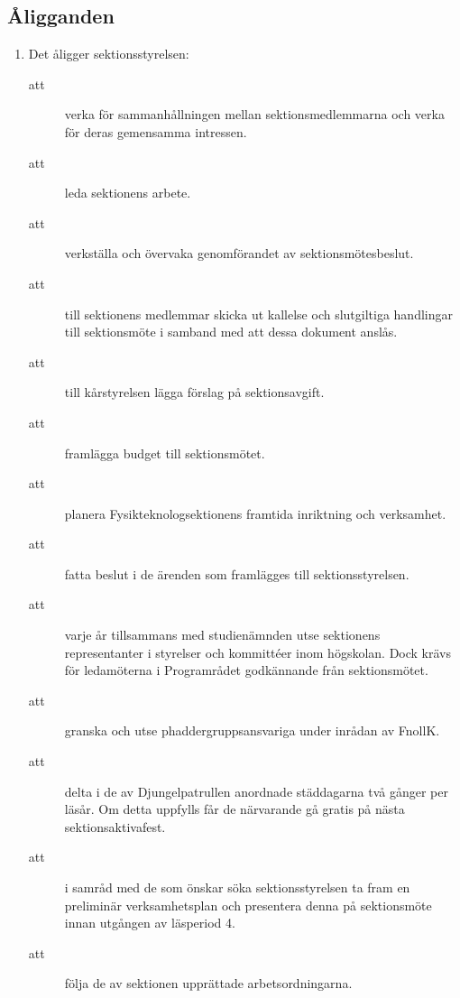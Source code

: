 \documentclass[11pt,a4paper]{article}
\begin{document}
\subsection{Åligganden}

\begin{enumerate}[\thesubsection .1]

  \item Det åligger sektionsstyrelsen:
    \begin{description}
      \item[att] verka för sammanhållningen mellan sektionsmedlemmarna
      och verka för deras gemensamma intressen.
      \item[att] leda sektionens arbete.
      \item[att] verkställa och övervaka genomförandet av sektionsmötesbeslut.
      \item[att] till sektionens medlemmar skicka ut kallelse och slutgiltiga handlingar
      till sektionsmöte i samband med att dessa dokument anslås.
      \item[att] till kårstyrelsen lägga förslag på sektionsavgift. 
      \item[att] framlägga budget till sektionsmötet.
      \item[att] planera Fysikteknologsektionens framtida inriktning och verk\-sam\-het.
      \item[att] fatta beslut i de ärenden som framlägges till sektionsstyrelsen.
      \item[att] varje år tillsammans med studienämnden utse
      sektionens representanter i styrelser och kommittéer inom
      högskolan. Dock krävs för ledamöterna i Programrådet godkännande
      från sektionsmötet.
      \item[att] granska och utse phaddergruppsansvariga under inrådan av
      FnollK.
      \item[att] delta i de av Djungelpatrullen anordnade städdagarna två gånger per
      läsår. Om detta uppfylls får de närvarande gå gratis på nästa
      sektionsaktivafest.
      \item[att] i samråd med de som önskar söka sektionsstyrelsen ta fram en preliminär 
      verksamhetsplan och presentera denna på sektionsmöte innan utgången av läsperiod 4.
\item[att] följa de av sektionen upprättade arbetsordningarna.
    \end{description}


\end{enumerate}
\end{document}
